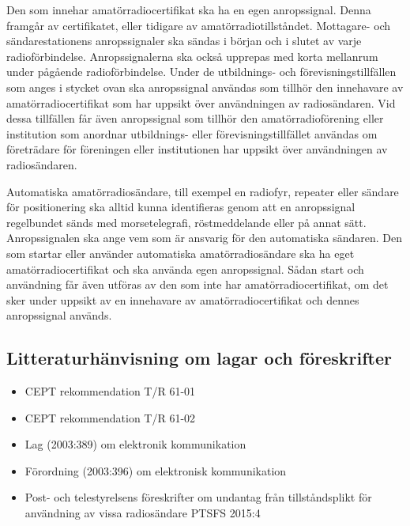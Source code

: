Den som innehar amatörradiocertifikat ska ha en egen anropssignal.
Denna framgår av certifikatet, eller tidigare av amatörradiotillståndet.
Mottagare- och sändarestationens anropssignaler ska sändas i början och i
slutet av varje radioförbindelse.
Anropssignalerna ska också upprepas med korta mellanrum under pågående
radioförbindelse. Under de utbildnings- och förevisningstillfällen som anges i
stycket ovan ska anropssignal användas som tillhör den innehavare av
amatörradiocertifikat som har uppsikt över användningen av radiosändaren.
Vid dessa tillfällen får även anropssignal som tillhör den amatörradioförening
eller institution som anordnar utbildnings- eller förevisningstillfället
användas om företrädare för föreningen eller institutionen har uppsikt över
användningen av radiosändaren.

Automatiska amatörradiosändare, till exempel en radiofyr, repeater eller
sändare för positionering ska alltid kunna identifieras genom att en
anropssignal regelbundet sänds med morsetelegrafi, röstmeddelande eller
på annat sätt.
Anropssignalen ska ange vem som är ansvarig för den automatiska sändaren.
Den som startar eller använder automatiska amatörradiosändare ska ha eget
amatörradiocertifikat och ska använda egen anropssignal.
Sådan start och användning får även utföras av den som inte har
amatörradiocertifikat, om det sker under uppsikt av en innehavare av
amatörradiocertifikat och dennes anropssignal används.

\subsection{Litteraturhänvisning om lagar och föreskrifter}

\begin{itemize}
\item CEPT rekommendation T/R 61-01 \cite{TR6101}
\item CEPT rekommendation T/R 61-02 \cite{TR6102}
\item Lag (2003:389) om elektronik kommunikation \cite{SFS2003:389}
\item Förordning (2003:396) om elektronisk kommunikation \cite{SFS2003:396}
\item Post- och telestyrelsens föreskrifter om undantag från tillståndsplikt för
användning av vissa radiosändare PTSFS 2015:4 \cite{PTSFS2015:4}
\end{itemize}
